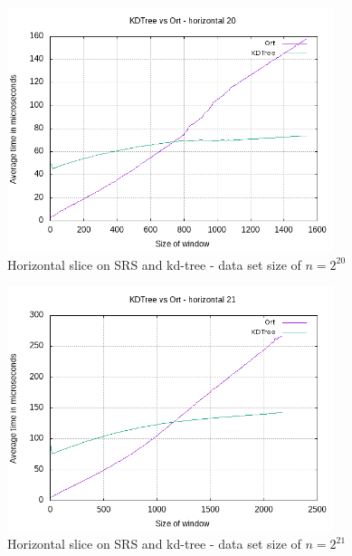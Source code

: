 {\begin{figure}[h]
    \centering
    \includegraphics[width = 0.85\textwidth]{pictures/analysis/hori_20.png}
    \caption{Horizontal slice on SRS and kd-tree - data set size of $n=2^{20}$}\label{fig:hori_20}
\end{figure}


\begin{figure}[h]
    \centering
    \includegraphics[width = 0.85\textwidth]{pictures/analysis/hori_21.png}
    \caption{Horizontal slice on SRS and kd-tree - data set size of $n=2^{21}$}\label{fig:hori_21}
\end{figure}

}
